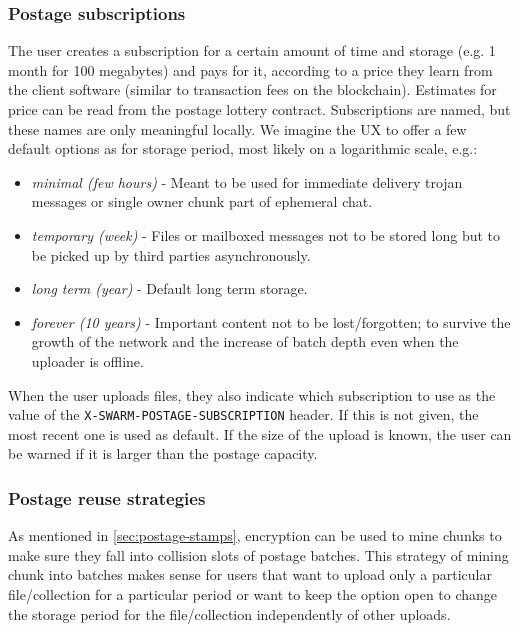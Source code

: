 \subsubsection{Postage subscriptions}

The user creates a subscription for a certain amount of time and storage (e.g. 1 month for 100 megabytes) and pays for it, according to a price they learn from the client software (similar to transaction fees on the blockchain). Estimates for price can be read from the postage lottery contract. Subscriptions are named, but these names are only meaningful locally. We imagine the UX to offer a few default options as for storage period, most likely on a logarithmic scale, e.g.: 

\begin{itemize}
\item \emph{minimal (few hours)} - Meant to be used for immediate delivery trojan messages or single owner chunk part of ephemeral chat. 
\item \emph{temporary (week)} - Files or mailboxed messages not to be stored long but to be picked up by third parties asynchronously.
\item \emph{long term (year)} - Default long term storage. 
\item \emph{forever (10 years)} - Important content not to be lost/forgotten; to survive the growth of the network and the increase of batch depth even when the uploader is offline.
\end{itemize}

When the user uploads files, they also indicate which subscription to use as the value of the \texttt{X-SWARM-POSTAGE-SUBSCRIPTION} header. If this is not given, the most recent one is used as default. If the size of the upload is known, the user can be warned if it is larger than the postage capacity. 

\subsubsection{Postage reuse strategies}

As mentioned in \ref{sec:postage-stamps}, encryption can be used to mine chunks to make sure they fall into collision slots of postage batches. This strategy of mining chunk into batches makes sense for users that want to upload only a particular file/collection for a particular period or want to keep the option open to change the storage period for the file/collection independently of other uploads.

